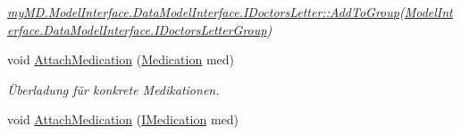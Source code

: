 \begin{CompactItemize}
\begin{CompactList}\small\item\em \hyperlink{interfacemy_m_d_1_1_model_interface_1_1_data_model_interface_1_1_i_doctors_letter_06720c4c5d7e38157063166e916bbf8a}{my\-MD.Model\-Interface.Data\-Model\-Interface.IDoctors\-Letter::Add\-To\-Group}(\hyperlink{interfacemy_m_d_1_1_model_interface_1_1_data_model_interface_1_1_i_doctors_letter_group}{Model\-Interface.Data\-Model\-Interface.IDoctors\-Letter\-Group}) \item\end{CompactList}\item 
void \hyperlink{classmy_m_d_1_1_model_1_1_data_model_1_1_doctors_letter_c6c9d35845c1c0e4c389656215df6e2e}{Attach\-Medication} (\hyperlink{classmy_m_d_1_1_model_1_1_data_model_1_1_medication}{Medication} med)
\begin{CompactList}\small\item\em \"{U}berladung f\"{u}r konkrete Medikationen. \item\end{CompactList}\item 
\hypertarget{classmy_m_d_1_1_model_1_1_data_model_1_1_doctors_letter_d30d4a881bdfd437b1b1da6f3fa7cb38}{
void \hyperlink{classmy_m_d_1_1_model_1_1_data_model_1_1_doctors_letter_d30d4a881bdfd437b1b1da6f3fa7cb38}{Attach\-Medication} (\hyperlink{interfacemy_m_d_1_1_model_interface_1_1_data_model_interface_1_1_i_medication}{IMedication} med)}
\label{dc/d86/classmy_m_d_1_1_model_1_1_data_model_1_1_doctors_letter_d30d4a881bdfd437b1b1da6f3fa7cb38}


\end{CompactItemize}
